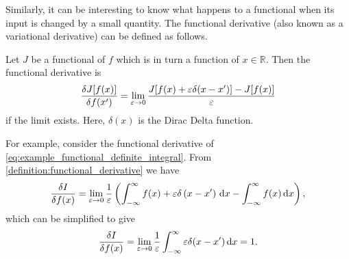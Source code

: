 Similarly, it can be interesting to know what happens to a functional when its input is changed by a small quantity.
The functional derivative (also known as a variational derivative) can be defined as follows.
\begin{definition}
  \label{definition:functional_derivative}
  Let $J$ be a functional of $f$ which is in turn a function of $x \in \mathbb{R}$. Then the functional derivative is
  \begin{equation}
    \label{eq:definition_of_functional_derivative}
    \fdv{J[f(x)]}{f(x')} = \lim_{\epsilon\rightarrow 0} \frac{J[f(x) + \epsilon \delta(x - x')] - J[f(x)]}{\epsilon}
  \end{equation}
  if the limit exists. Here, $\delta(x)$ is the Dirac Delta function.
\end{definition}

For example, consider the functional derivative of \cref{eq:example_functional_definite_integral}. From \cref{definition:functional_derivative}
we have
\begin{equation*}
  \fdv{I}{f(x)} = \lim_{\epsilon\rightarrow 0} \frac{1}{\epsilon} \left(\int_{-\infty}^{\infty} f(x) + \epsilon \delta\left(x-x'\right)\,\mathrm{d}x 
      - \int_{-\infty}^{\infty} f(x)\,\mathrm{d}x\right),
\end{equation*}
which can be simplified to give
\begin{equation*}
  \fdv{I}{f(x)} = \lim_{\epsilon\rightarrow 0}\frac{1}{\epsilon}\int_{-\infty}^{\infty} \epsilon \delta(x-x')\,\mathrm{d}x = 1.
\end{equation*}

